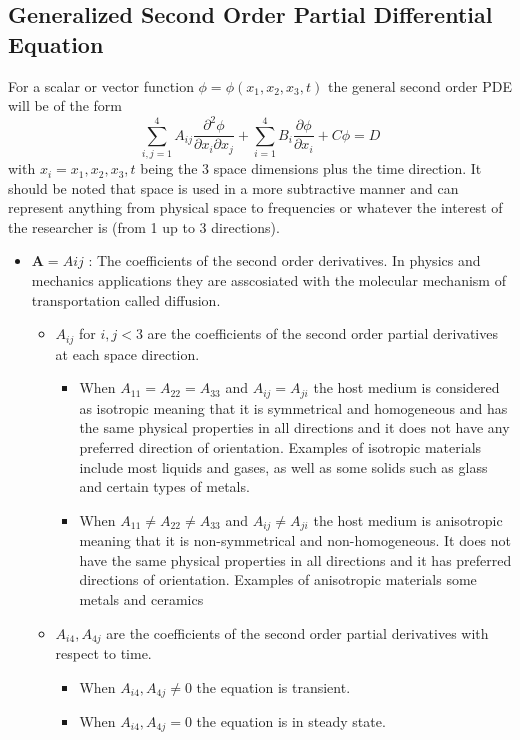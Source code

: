 \documentclass{article}
\begin{document}
	\subsection{Generalized Second Order Partial Differential Equation}
	For a scalar or vector function $\phi = \phi(x_1, x_2, x_3,t)$ the general second order PDE will be of the form
	\begin{equation} \label{generalPDE}
		\sum_{i,j=1}^{4} A_{ij} \frac{\partial ^2 \phi}{\partial x_i \partial x_j} + \sum_{i=1}^{4} B_i \frac{\partial \phi}{\partial x_i }+ C \phi = D
	\end{equation}
	with $x_i = x_1,x_2,x_3,t$ being the 3 space dimensions plus the time direction. It should be noted that space is used in a more subtractive manner and can represent anything from physical space to frequencies or whatever the interest of the researcher is (from 1 up to 3 directions).
	\begin{itemize}
		\item $\boldsymbol{A} = Aij$ : The coefficients of the second order derivatives. In physics and mechanics applications they are asscosiated with the molecular mechanism of transportation called diffusion.
		\begin{itemize}
			\item $A_{ij}$ for $i,j<3$ are the coefficients of the second order partial derivatives at each space direction. 
			
			\begin{itemize}
				\item When $A_{11}=A_{22}=A_{33}$ and $A_{ij}=A_{ji}$ the host medium is considered as isotropic meaning that it is symmetrical and homogeneous and has the same physical properties in all directions and it does not have any preferred direction of orientation. Examples of isotropic materials include most liquids and gases, as well as some solids such as glass and certain types of metals.
				
				\item When $A_{11} \neq A_{22} \neq A_{33}$ and $A_{ij}\neq A_{ji}$ the host medium is  anisotropic meaning that it is non-symmetrical and non-homogeneous. It does not have the same physical properties in all directions and it has preferred directions of orientation. Examples of anisotropic materials some metals and ceramics
			\end{itemize}
	
			\item $A_{i4},A_{4j}$ are the coefficients of the second order partial derivatives with respect to time.
			\begin{itemize}
				\item When $A_{i4},A_{4j} \neq 0$ the equation is transient. 
				\item When $A_{i4},A_{4j} = 0$ the equation is in steady state. 
			\end{itemize}
		\end{itemize}
	\end{itemize}
\end{document}
